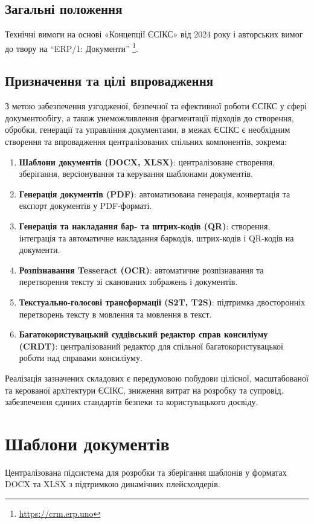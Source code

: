 \documentclass{article}
\begin{document}
\newpage
\subsection*{Загальні положення}

Технічні вимоги на основі «Концепції ЄСІКС» від 2024 року \cite{esiks} і авторських вимог до твору
на ``ERP/1: Документи'' \footnote{\url{https://crm.erp.uno}}.

\subsection*{Призначення та цілі впровадження}
З метою забезпечення узгодженої, безпечної та ефективної роботи ЄСІКС у сфері документообігу,
а також унеможливлення фрагментації підходів до створення, обробки, генерації та управління документами,
в межах ЄСІКС є необхідним створення та впровадження централізованих спільних компонентів, зокрема:
\begin{enumerate}
\item \textbf{Шаблони документів (DOCX, XLSX)}: централізоване створення, зберігання, версіонування та керування шаблонами документів.
\item \textbf{Генерація документів (PDF)}: автоматизована генерація, конвертація та експорт документів у PDF-форматі.
\item \textbf{Генерація та накладання бар- та штрих-кодів (QR)}: створення, інтеграція та автоматичне накладання баркодів, штрих-кодів і QR-кодів на документи.
\item \textbf{Розпізнавання Tesseract (OCR)}: автоматичне розпізнавання та перетворення тексту зі сканованих зображень і документів.
\item \textbf{Текстуально-голосові трансформації (S2T, T2S)}: підтримка двосторонніх перетворень тексту в мовлення та мовлення в текст.
\item \textbf{Багатокористувацький суддівський редактор справ консиліуму (CRDT)}: централізований редактор для спільної багатокористувацької роботи над справами консиліуму.
\end{enumerate}

Реалізація зазначених складових є передумовою побудови цілісної, масштабованої та керованої архітектури ЄСІКС, зниження витрат на розробку та супровід, забезпечення єдиних стандартів безпеки та користувацького досвіду.

\newpage
\section{Шаблони документів}
Централізована підсистема для розробки та зберігання шаблонів у форматах DOCX та XLSX з підтримкою динамічних плейсхолдерів.
\end{document}
